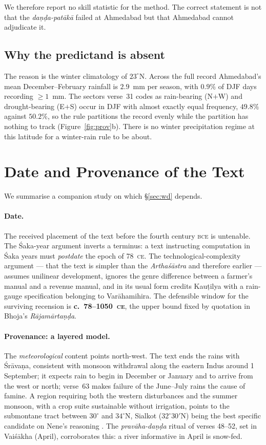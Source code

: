 \documentclass[11pt,a4paper]{article}
\newcommand{\skt}[1]{\textcolor{skt}{\textit{#1}}}
\begin{document}
We therefore report no skill statistic for the method. The correct statement is not that the \skt{daṇḍa-patākā} failed at Ahmedabad but that Ahmedabad cannot adjudicate it.

\subsection{Why the predictand is absent}

The reason is the winter climatology of $23^\circ$N. Across the full record Ahmedabad's mean December--February rainfall is $2.9$~mm per season, with $0.9\%$ of DJF days recording $\ge1$~mm. The sectors verse~31 codes as rain-bearing (N$+$W) and drought-bearing (E$+$S) occur in DJF with almost exactly equal frequency, $49.8\%$ against $50.2\%$, so the rule partitions the record evenly while the partition has nothing to track (Figure~\ref{fig:prov}b). There is no winter precipitation regime at this latitude for a winter-rain rule to be about.

\section{Date and Provenance of the Text}
\label{sec:prov}

We summarise a companion study \cite{ghoshprov} on which \S\ref{sec:wd} depends.

\paragraph{Date.} The received placement of the text before the fourth century \textsc{bce} is untenable. The Śaka-year argument inverts a terminus: a text instructing computation in Śaka years must \emph{postdate} the epoch of 78~\textsc{ce}. The technological-complexity argument --- that the text is simpler than the \skt{Arthaśāstra} and therefore earlier --- assumes unilinear development, ignores the genre difference between a farmer's manual and a revenue manual, and in its usual form credits Kauṭilya with a rain-gauge specification belonging to Varāhamihira. The defensible window for the surviving recension is \textbf{c.~78--1050~\textsc{ce}}, the upper bound fixed by quotation in Bhoja's \skt{Rājamārtaṇḍa}.

\paragraph{Provenance: a layered model.} The \emph{meteorological} content points north-west. The text ends the rains with Śrāvaṇa, consistent with monsoon withdrawal along the eastern Indus around 1 September; it expects rain to begin in December or January and to arrive from the west or north; verse~63 makes failure of the June--July rains the cause of famine. A region requiring both the western disturbances and the summer monsoon, with a crop suite sustainable without irrigation, points to the submontane tract between $30^\circ$ and $34^\circ$N, Sialkot ($32^\circ30'$N) being the best specific candidate on Nene's reasoning \cite{sadhale}. The \skt{pravāha-daṇḍa} ritual of verses 48--52, set in Vaiśākha (April), corroborates this: a river informative in April is snow-fed.
\end{document}
